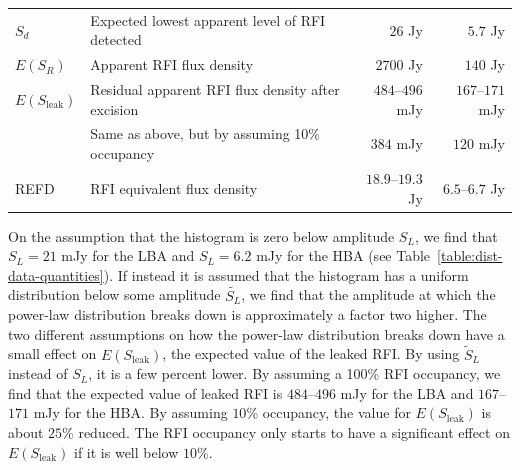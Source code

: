 \documentclass[useAMS,usenatbib]{mn2e}
\begin{document}
\begin{table}
\begin{minipage}{12cm}
\begin{tabular}{@{}llrr@{}}
$S_d$ & Expected lowest apparent level of RFI detected & $26$ Jy & $5.7$ Jy\\ %
$E(S_R)$ & Apparent RFI flux density & $2700$ Jy & $140$ Jy \\
$E(S_\textrm{leak})$& Residual apparent RFI flux density after excision & $484$--$496$ mJy & $167$--$171$ mJy \\
 & Same as above, but by assuming 10\% occupancy & $384$ mJy & $120$ mJy \\ %
REFD& RFI equivalent flux density & $18.9$--$19.3$ Jy & $6.5$--$6.7$ Jy \\
\hline
\hline
\end{tabular}
\end{minipage}
\end{table}

On the assumption that the histogram is zero below amplitude $S_L$, we find that $S_L=21$ mJy for the LBA and $S_L=6.2$ mJy for the HBA (see Table~\ref{table:dist-data-quantities}). If instead it is assumed that the histogram has a uniform distribution below some amplitude $\tilde{S_L}$, we find that the amplitude at which the power-law distribution breaks down is approximately a factor two higher. The two different assumptions on how the power-law distribution breaks down have a small effect on $E(S_\textrm{leak})$, the expected value of the leaked RFI. By using $\tilde{S}_L$ instead of $S_L$, it is a few percent lower. By assuming a 100\% RFI occupancy, we find that the expected value of leaked RFI is $484$--$496$ mJy for the LBA and $167$--$171$ mJy for the HBA. By assuming $10$\% occupancy, the value for $E(S_\textrm{leak})$ is about $25$\% reduced. The RFI occupancy only starts to have a significant effect on $E(S_\textrm{leak})$ if it is well below $10$\%. 
\end{document}
